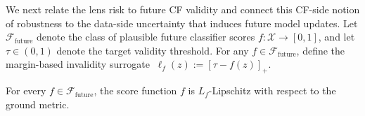 




We next relate the lens risk to future CF validity and connect this
CF-side notion of robustness to the data-side uncertainty that induces
future model updates.
Let $\mathcal{F}_{\mathrm{future}}$ denote the class of plausible future
classifier scores $f:\mathcal{X}\to[0,1]$, and let
$\tau\in(0,1)$ denote the target validity threshold.
For any $f\in\mathcal{F}_{\mathrm{future}}$, define the margin-based
invalidity surrogate
$\
    \ell_f(z)
    :=
    [\tau-f(z)]_+.
    \label{eq:invalidity_surrogate}
$

\begin{assumption}
\label{ass:lipschitz_future}
For every $f\in\mathcal{F}_{\mathrm{future}}$, the score function $f$ is
$L_f$-Lipschitz with respect to the ground metric.
\end{assumption}

